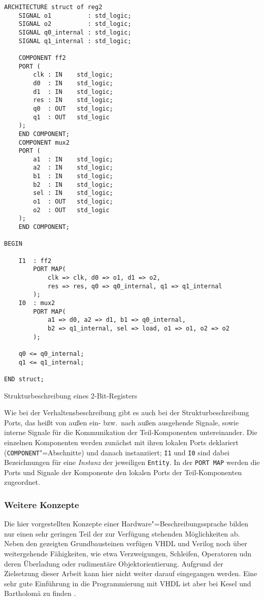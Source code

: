 \begin{code}
    \begin{verbatim}
ARCHITECTURE struct of reg2
    SIGNAL o1          : std_logic;
    SIGNAL o2          : std_logic;
    SIGNAL q0_internal : std_logic;
    SIGNAL q1_internal : std_logic;

    COMPONENT ff2
    PORT (
        clk : IN    std_logic;
        d0  : IN    std_logic;
        d1  : IN    std_logic;
        res : IN    std_logic;
        q0  : OUT   std_logic;
        q1  : OUT   std_logic
    );
    END COMPONENT;
    COMPONENT mux2
    PORT (
        a1  : IN    std_logic;
        a2  : IN    std_logic;
        b1  : IN    std_logic;
        b2  : IN    std_logic;
        sel : IN    std_logic;
        o1  : OUT   std_logic;
        o2  : OUT   std_logic
    );
    END COMPONENT;

BEGIN

    I1  : ff2
        PORT MAP(
            clk => clk, d0 => o1, d1 => o2,
            res => res, q0 => q0_internal, q1 => q1_internal
        );
    I0  : mux2
        PORT MAP(
            a1 => d0, a2 => d1, b1 => q0_internal,
            b2 => q1_internal, sel => load, o1 => o1, o2 => o2
        );

    q0 <= q0_internal;
    q1 <= q1_internal;

END struct;
    \end{verbatim}
    \caption{Strukturbeschreibung eines 2-Bit-Registers \cite[siehe][36]{kesel2013}}
    \label{fpga:hdl:regstruct}
\end{code}
\noindent
Wie bei der Verhaltensbeschreibung gibt es auch bei der Strukturbeschreibung
Ports, das heißt von außen ein- bzw.\ nach außen ausgehende Signale, sowie
interne Signale für die Kommunikation der Teil-Komponenten untereinander. Die
einzelnen Komponenten werden zunächst mit ihren lokalen Ports deklariert
(\texttt{COMPONENT}"=Abschnitte) und danach instanziiert; \texttt{I1} und
\texttt{I0} sind dabei Bezeichnungen für eine \textit{Instanz} der jeweiligen
\texttt{Entity}. In der \texttt{PORT MAP} werden die Ports und Signale der
Komponente den lokalen Ports der Teil-Komponenten zugeordnet.
\cite[vgl.][37]{kesel2013}

\subsubsection{Weitere Konzepte}

Die hier vorgestellten Konzepte einer Hardware"=Beschreibungssprache bilden nur
einen sehr geringen Teil der zur Verfügung stehenden Möglichkeiten ab. Neben den
gezeigten Grundbausteinen verfügen VHDL und Verilog noch über weitergehende
Fähigkeiten, wie etwa Verzweigungen, Schleifen, Operatoren udn deren Überladung
oder rudimentäre Objektorientierung. Aufgrund der Zielsetzung dieser Arbeit kann
hier nicht weiter darauf eingegangen werden. Eine sehr gute Einführung in die
Programmierung mit VHDL ist aber bei Kesel und Bartholomä zu finden
\cite[siehe][]{kesel2013}. 

